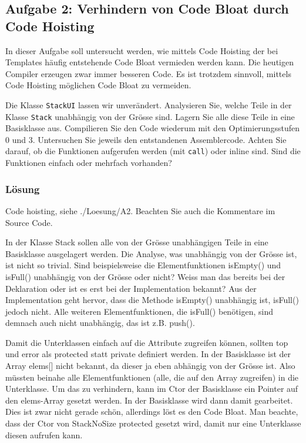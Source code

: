 \subsection{Aufgabe 2: Verhindern von Code Bloat durch Code Hoisting}
In dieser Aufgabe soll untersucht werden, wie mittels Code Hoisting der bei Templates häufig entstehende Code Bloat vermieden werden kann. Die heutigen Compiler erzeugen zwar immer besseren Code. Es ist trotzdem sinnvoll, mittels Code Hoisting möglichen Code Bloat zu vermeiden.

Die Klasse \texttt{StackUI} lassen wir unverändert. Analysieren Sie, welche Teile in der Klasse \texttt{Stack} unabhängig von der Grösse sind. Lagern Sie alle diese Teile in eine Basisklasse aus. Compilieren Sie den Code wiederum mit den Optimierungsstufen 0 und 3. Untersuchen Sie jeweils den entstandenen Assemblercode. Achten Sie darauf, ob die Funktionen aufgerufen werden (mit \texttt{call}) oder inline sind. Sind die Funktionen einfach oder mehrfach vorhanden?

\subsubsection{Lösung}
Code hoisting, siehe ./Loesung/A2. Beachten Sie auch die Kommentare im Source Code.

In der Klasse Stack sollen alle von der Grösse unabhängigen Teile in eine Basisklasse ausgelagert werden. Die Analyse, was unabhängig von der Grösse ist, ist nicht so trivial. Sind beispielsweise die Elementfunktionen isEmpty() und isFull() unabhängig von der Grösse oder nicht? Weiss man das bereits bei der Deklaration oder ist es erst bei der Implementation bekannt? Aus der Implementation geht hervor, dass die Methode isEmpty() unabhängig ist, isFull() jedoch nicht. Alle weiteren Elementfunktionen, die isFull() benötigen, sind demnach auch nicht unabhängig, das ist z.B. push().

Damit die Unterklassen einfach auf die Attribute zugreifen können, sollten top und error als protected statt private definiert werden. In der Basisklasse ist der Array elems[] nicht bekannt, da dieser ja eben abhängig von der Grösse ist. Also müssten beinahe alle Elementfunktionen (alle, die auf den Array zugreifen) in die Unterklasse. Um das zu verhindern, kann im Ctor der Basisklasse ein Pointer auf den elems-Array gesetzt werden. In der Basisklasse wird dann damit gearbeitet. Dies ist zwar nicht gerade schön, allerdings löst es den Code Bloat. Man beachte, dass der Ctor von StackNoSize protected gesetzt wird, damit nur eine Unterklasse diesen aufrufen kann.

